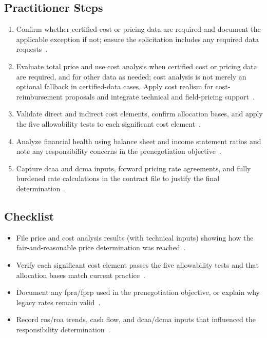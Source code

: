 \documentclass[../main.tex]{subfiles}
\begin{document}
\subsection{Practitioner Steps}
\begin{enumerate}
  \item Confirm whether certified cost or pricing data are required and document the applicable exception if not; ensure the solicitation includes any required data requests~\autocite{DFARS-Part215-Deviation-2026,edo-3-2-4-cost-price-evaluation-2025}.
  \item Evaluate total price and use cost analysis when certified cost or pricing data are required, and for other data as needed; cost analysis is not merely an optional fallback in certified-data cases. Apply cost realism for cost-reimbursement proposals and integrate technical and field-pricing support~\autocite{edo-3-2-4-cost-price-evaluation-2025,FAR-Overhaul-Part15-2026}.
  \item Validate direct and indirect cost elements, confirm allocation bases, and apply the five allowability tests to each significant cost element~\autocite{FAR-31-201-2-Allowability,FAR-31-202-Direct-Costs,FAR-31-203-Indirect-Costs}.
  \item Analyze financial health using balance sheet and income statement ratios and note any responsibility concerns in the prenegotiation objective~\autocite{edo-3-2-4-cost-price-evaluation-2025}.
  \item Capture \ac{dcaa} and \ac{dcma} inputs, forward pricing rate agreements, and fully burdened rate calculations in the contract file to justify the final determination~\autocite{edo-3-2-4-cost-price-evaluation-2025,FAR-15-404-2-Field-Pricing-Assistance,FAR-15-406-1-Prenegotiation-Objectives,FAR-15-406-3-Documenting-Negotiation,FAR-15-407-3-FPRA}.
\end{enumerate}

\subsection{Checklist}
\begin{itemize}
  \item File price and cost analysis results (with technical inputs) showing how the fair-and-reasonable price determination was reached~\autocite{FAR-15-404-1-Proposal-Analysis,FAR-15-406-3-Documenting-Negotiation}.
  \item Verify each significant cost element passes the five allowability tests and that allocation bases match current practice~\autocite{FAR-31-201-2-Allowability,FAR-31-201-4-Allocability,FAR-31-203-Indirect-Costs}.
  \item Document any \ac{fpra}/\ac{fprp} used in the prenegotiation objective, or explain why legacy rates remain valid~\autocite{FAR-15-406-1-Prenegotiation-Objectives,FAR-15-407-3-FPRA}.
  \item Record \ac{ros}/\ac{roa} trends, cash flow, and \ac{dcaa}/\ac{dcma} inputs that influenced the responsibility determination~\autocite{edo-3-2-4-cost-price-evaluation-2025}.
\end{itemize}
\end{document}
